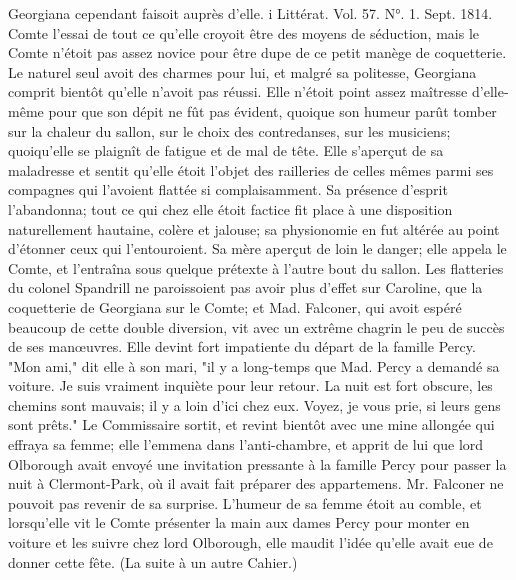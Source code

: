 Georgiana cependant faisoit auprès d’elle.
i Littérat. Vol. 57. N°. 1. Sept. 1814. \setcounter{page}{138} Comte l'essai de tout ce qu'elle croyoit être des moyens de séduction, mais le Comte n'étoit pas assez novice pour être dupe de ce petit manège de coquetterie. Le naturel seul avoit des charmes pour lui, et malgré sa politesse, Georgiana comprit bientôt qu'elle n'avoit pas réussi. Elle n'étoit point assez maîtresse d'elle-même pour que son dépit ne fût pas évident, quoique son humeur parût tomber sur la chaleur du sallon, sur le choix des contredanses, sur les musiciens; quoiqu'elle se plaignît de fatigue et de mal de tête. Elle s'aperçut de sa maladresse et sentit qu'elle étoit l'objet des railleries de celles mêmes parmi ses compagnes qui l'avoient flattée si complaisamment. Sa présence d'esprit l'abandonna; tout ce qui chez elle étoit factice fit place à une disposition naturellement hautaine, colère et jalouse; sa physionomie en fut altérée au point d'étonner ceux qui l'entouroient. Sa mère aperçut de loin le danger; elle appela le Comte, et l'entraîna sous quelque prétexte à l'autre bout du sallon. Les flatteries du colonel Spandrill ne paroissoient pas avoir plus d'effet sur Caroline, que la coquetterie de Georgiana sur le Comte; et Mad. Falconer, qui avoit espéré beaucoup de cette double diversion, vit avec un extrême\setcounter{page}{139} chagrin le peu de succès de ses manœuvres. Elle devint fort impatiente du départ de la famille Percy. "Mon ami," dit elle à son mari, "il y a long-temps que Mad. Percy a demandé sa voiture. Je suis vraiment inquiète pour leur retour. La nuit est fort obscure, les chemins sont mauvais; il y a loin d'ici chez eux. Voyez, je vous prie, si leurs gens sont prêts." Le Commissaire sortit, et revint bientôt avec une mine allongée qui effraya sa femme; elle l'emmena dans l'anti-chambre, et apprit de lui que lord Olborough avait envoyé une invitation pressante à la famille Percy pour passer la nuit à Clermont-Park, où il avait fait préparer des appartemens. Mr. Falconer ne pouvoit pas revenir de sa surprise. L'humeur de sa femme étoit au comble, et lorsqu'elle vit le Comte présenter la main aux dames Percy pour monter en voiture et les suivre chez lord Olborough, elle maudit l'idée qu'elle avait eue de donner cette fête.
\large{(La suite à un autre Cahier.)}